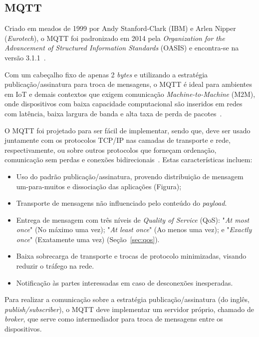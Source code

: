 \subsection{MQTT}\label{sec:mqtt}

Criado em meados de 1999 por Andy Stanford-Clark (IBM) e Arlen Nipper (\textit{Eurotech}), o MQTT foi padronizado em 2014 pela \textit{Organization for the Advancement of Structured Information Standards} (OASIS) e encontra-se na versão 3.1.1~\cite{mqttv3.1.1}.

Com um cabeçalho fixo de apenas 2 \textit{bytes} e utilizando a estratégia publicação/assinatura para troca de mensagens, o MQTT é ideal para ambientes em IoT e demais contextos que exigem comunicação \textit{Machine-to-Machine} (M2M), onde  dispositivos com baixa capacidade computacional são inseridos em redes com latência, baixa largura de banda e alta taxa de perda de pacotes~\cite{mqttv3.1.1}.

O MQTT foi projetado para ser fácil de implementar, sendo que, deve ser usado juntamente com os protocolos TCP/IP nas camadas de transporte e rede, respectivamente, ou sobre outros protocolos que forneçam ordenação, comunicação sem perdas e conexões bidirecionais~\cite{mqttv3.1.1}. Estas características incluem:

\begin{itemize}
	\item Uso do padrão publicação/assinatura, provendo distribuição de mensagem um-para-muitos e dissociação das aplicações (Figura);
	\item Transporte de mensagens não influenciado pelo conteúdo do \textit{payload}.
	\item Entrega de mensagem com três níveis de \textit{Quality of Service} (QoS): "\textit{At most once}" (No máximo uma vez); "\textit{At least once}" (Ao menos uma vez); e "\textit{Exactly once}" (Exatamente uma vez) (Seção~\ref{sec:qos}).
	\item  Baixa sobrecarga de transporte e trocas de protocolo minimizadas, visando reduzir o tráfego na rede.
	\item Notificação às partes interessadas em caso de desconexões inesperadas.
\end{itemize} 

Para realizar a comunicação sobre a estratégia publicação/assinatura (do inglês, \textit{publish/subscriber}), o MQTT deve implementar um servidor próprio, chamado de \textit{broker}, que serve como intermediador para troca de mensagens entre os dispositivos.

